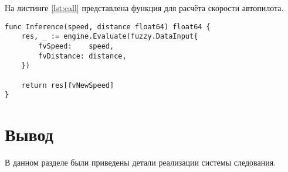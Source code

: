 На листинге \ref{lst:call} представлена функция для расчёта скорости автопилота.

\begin{lstlisting}[label=lst:call,caption=Функция для расчёта скорости автопилота]
func Inference(speed, distance float64) float64 {
	res, _ := engine.Evaluate(fuzzy.DataInput{
		fvSpeed:    speed,
		fvDistance: distance,
	})
	
	return res[fvNewSpeed]
}
\end{lstlisting}


\section*{Вывод}

В данном разделе были приведены детали реализации системы следования.

\clearpage
